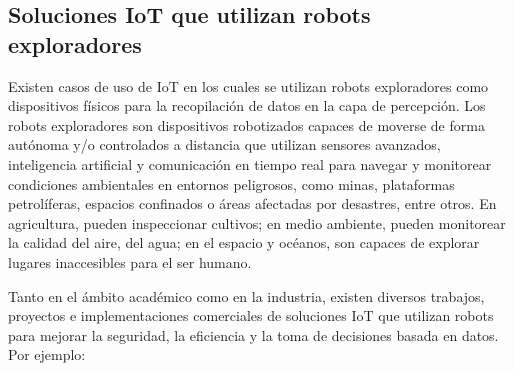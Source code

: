 \subsection{Soluciones IoT que utilizan robots exploradores}


Existen casos de uso de IoT en los cuales se utilizan robots exploradores como dispositivos físicos para la recopilación de datos en la capa de percepción. Los robots exploradores son dispositivos robotizados capaces de moverse de forma autónoma y/o controlados a distancia que utilizan sensores avanzados, inteligencia artificial y comunicación en tiempo real para navegar y monitorear condiciones ambientales en entornos peligrosos, como minas, plataformas petrolíferas, espacios confinados o áreas afectadas por desastres, entre otros. En agricultura, pueden inspeccionar cultivos; en medio ambiente, pueden monitorear la calidad del aire, del agua; en el espacio y océanos, son capaces de explorar lugares inaccesibles para el ser humano. 

Tanto en el ámbito académico como en la industria, existen diversos trabajos, proyectos e implementaciones comerciales de soluciones IoT que utilizan robots para mejorar la seguridad, la eficiencia y la toma de decisiones basada en datos. Por ejemplo:

